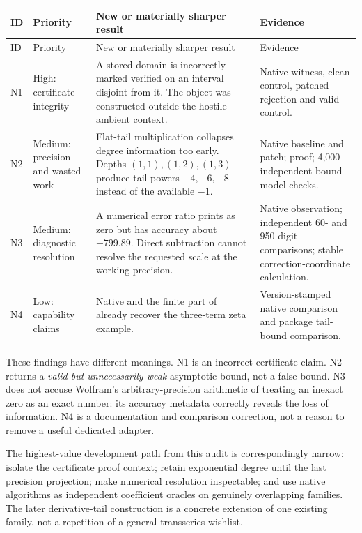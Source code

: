 \documentclass[11pt,letterpaper]{article}
\newcommand{\code}[1]{\texttt{\detokenize{#1}}}
\begin{document}
\begin{longtable}{@{}P{0.55in}P{1.03in}P{3.08in}P{1.38in}@{}}
\toprule ID & Priority & New or materially sharper result & Evidence\\\midrule
\endfirsthead
\toprule ID & Priority & New or materially sharper result & Evidence\\\midrule
\endhead
N1 & High: certificate integrity & A stored domain is incorrectly marked verified
on an interval disjoint from it. The object was constructed outside the hostile
ambient context. & Native witness, clean control, patched rejection and valid control.\\
N2 & Medium: precision and wasted work & Flat-tail multiplication collapses degree
information too early. Depths $(1,1),(1,2),(1,3)$ produce tail powers $-4,-6,-8$
instead of the available $-1$. & Native baseline and patch; proof; 4,000 independent
bound-model checks.\\
N3 & Medium: diagnostic resolution & A numerical error ratio prints as zero but
has accuracy about $-799.89$. Direct subtraction cannot resolve the requested
scale at the working precision. & Native observation; independent 60- and
950-digit comparisons; stable correction-coordinate calculation.\\
N4 & Low: capability claims & Native \code{Asymptotic} and the finite part of
\code{Series} already recover the three-term zeta example. & Version-stamped
native comparison and package tail-bound comparison.\\
\bottomrule
\end{longtable}

These findings have different meanings. N1 is an incorrect certificate claim.
N2 returns a \emph{valid but unnecessarily weak} asymptotic bound, not a false
bound. N3 does not accuse Wolfram's arbitrary-precision arithmetic of treating
an inexact zero as an exact number: its accuracy metadata correctly reveals the
loss of information. N4 is a documentation and comparison correction, not a
reason to remove a useful dedicated adapter.

The highest-value development path from this audit is correspondingly narrow:
isolate the certificate proof context; retain exponential degree until the
last precision projection; make numerical resolution inspectable; and use
native algorithms as independent coefficient oracles on genuinely overlapping
families. The later derivative-tail construction is a concrete extension of
one existing family, not a repetition of a general transseries wishlist.
\end{document}
